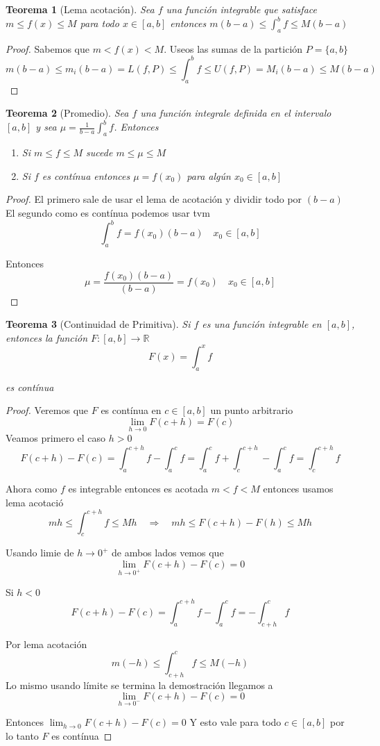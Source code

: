 \documentclass{article}
\theoremstyle{break}
\newtheorem{theorem}{Teorema}[section]
\begin{document}
\begin{theorem}[Lema acotación]
	Sea $f$ una función integrable que satisface $m \leq f(x) \leq M$ para todo
	$x \in [a,b]$ entonces $m(b-a) \leq \int_{a}^{b} f \leq M (b-a)$
\end{theorem}
\begin{proof}
	Sabemos que $m < f(x) < M$. Useos las sumas de la partición $P=\{a,b\}$
	\[ m(b-a )\leq m_i (b-a) =  L(f,P)\leq \int_{a}^{b} f \leq  U(f,P) = M_i (b-a) \leq M (b-a) \]
\end{proof}

\begin{theorem}[Promedio]
	Sea $f$ una función integrale definida en el intervalo $[a,b]$ y sea 
	$\mu = \frac{1}{b-a}\int_{a}^{b} f$. Entonces
	\begin{enumerate}
		\item Si $m \leq f \leq M$ sucede $m\leq \mu \leq M$
		\item Si $f$ es contínua entonces $\mu = f(x_0)$ para algún $x_0 \in [a,b]$
	\end{enumerate}
\end{theorem}
\begin{proof}
	El primero sale de usar el lema de acotación y dividir todo por $(b-a)$
	El segundo como es contínua podemos usar tvm \[\int_{a}^{b} f = f(x_0)(b-a) \quad x_0\in[a,b]\]

	Entonces \[ \mu = \frac{f(x_0)(b-a)}{(b-a)} = f(x_0) \quad x_0\in[a,b]\]
\end{proof}

\begin{theorem}[Continuidad de Primitiva]	
	Si $f$ es una función integrable en $[a,b]$, entonces la función 
	$F:[a,b]\rightarrow \mathbb{R}$	\[ F(x) = \int_{a}^{x} f \]

	es contínua
\end{theorem}
\begin{proof}
	Veremos que $F$ es contínua en $c\in [a,b]$ un punto arbitrario 
	\[ \lim_{h \rightarrow 0 } F(c+h) = F(c) \]
	Veamos primero el caso $h>0$
	\[ F(c+h) - F(c) = \int_{a}^{c+h}f - \int_{a}^{c} f = \int_{a}^{c} f 
	+ \int_{c}^{c+h} - \int_{a}^{c} f = \int_{c}^{c+h} f \]

	Ahora como $f$ es integrable entonces es acotada $m<f<M$ entonces usamos lema acotació
	\[ mh\leq \int_{c}^{c+h}f\leq Mh \quad \Longrightarrow \quad mh \leq F(c+h) - F(h) \leq Mh \]

	Usando limie de $h \rightarrow 0^+$ de ambos lados vemos que 
	\[ \lim_{h \rightarrow 0^+ } F(c+h)-F(c) = 0 \]

	Si $h<0$ \[ F(c+h) - F(c) = \int_{a}^{c+h} f - \int_{a}^{c}f = - \int_{c+h}^{c}f  \]

	Por lema acotación \[m(-h) \leq \int_{c+h}^{c}f \leq M(-h) \]
	Lo mismo usando límite se termina la demostración llegamos a 
	\[ \lim_{h \rightarrow 0^-} F(c+h) -F(c) = 0  \]

	Entonces $\lim_{h \rightarrow 0} F(c+h)-F(c)=0 $ 
	Y esto vale para todo $c \in [a,b]$ por lo tanto $F$ es contínua
\end{proof}
\end{document}
